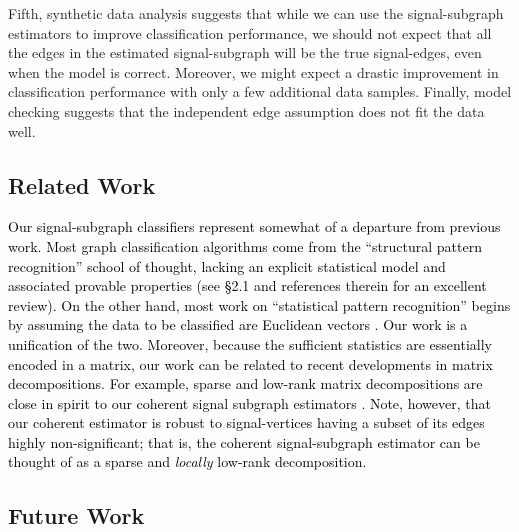 \documentclass[10pt,journal,cspaper,compsoc]{IEEEtran}
\providecommand{\tk}[1]{\textcolor{black}{#1}}
\begin{document}
Fifth, synthetic data analysis suggests that while we can use the signal-subgraph estimators to improve classification performance, we should not expect that all the edges in the estimated signal-subgraph will be the true signal-edges, even when the model is correct. Moreover, we might expect a drastic improvement in classification performance with only a few additional data samples.  Finally, model checking suggests that the independent edge assumption does not fit the data well.  

\subsection{Related Work} %
\label{sub:related_work}


\tk{Our signal-subgraph classifiers represent somewhat of a departure from previous work.  Most graph classification algorithms come from the ``structural pattern recognition'' school of thought, lacking an explicit statistical model and associated provable properties (see \cite{Bunke2011} \S2.1 and references therein for an excellent review). On the other hand, most work on ``statistical pattern recognition'' begins by assuming the data to be classified are Euclidean vectors \cite{Devroye1996}.  Our work is a unification of the two.  Moreover, because the sufficient statistics are essentially encoded in a matrix, our work can be related to recent developments in matrix decompositions.  For example, sparse and low-rank matrix decompositions are close in spirit to our coherent signal subgraph estimators \cite{Candes2009b, Ding2011, Chandrasekaran2011}. Note, however, that our coherent estimator is robust to signal-vertices having a subset of its edges highly non-significant; that is, the coherent signal-subgraph estimator can be thought of as a sparse and \emph{locally} low-rank decomposition.}

\subsection{Future Work} %
\label{sub:future_work}

\end{document}
